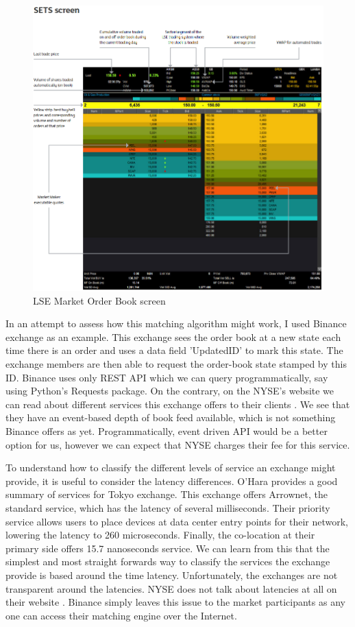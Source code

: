 \documentclass[12pt]{article}
\begin{document}
\begin{figure}[h!]
	\centering
  \includegraphics[scale=0.55]{lse.png}
  \caption{LSE Market Order Book screen}
  \label{fig:lse}
\end{figure}
\FloatBarrier

In an attempt to assess how this matching algorithm might work, I used Binance exchange as an example. This exchange sees the order book at a new state each time there is an order and uses a data field 'UpdatedID' to mark this state. The exchange members are then able to request the order-book state stamped by this ID. Binance uses only REST API which we can query programmatically, say using Python's Requests package. On the contrary, on the NYSE's website we can read about different services this exchange offers to their clients \cite{nyse}. We see that they have an event-based depth of book feed available, which is not something Binance offers as yet. Programmatically, event driven API would be a better option for us, however we can expect that NYSE charges their fee for this service.

To understand how to classify the different levels of service an exchange might provide, it is useful to consider the latency differences. O'Hara \cite{ohara} provides a good summary of services for Tokyo exchange. This exchange offers Arrownet, the standard service, which has the latency of several milliseconds. Their priority service allows users to place devices at data center entry points for their network, lowering the latency to  260 microseconds. Finally, the co-location at their primary side offers 15.7 nanoseconds service. We can learn from this that the simplest and most straight forwards way to classify the services the exchange provide is based around the time latency. Unfortunately, the exchanges are not transparent around the latencies. NYSE does not talk about latencies at all on their website \cite{nyse}. Binance simply leaves this issue to the market participants as any one can access their matching engine over the Internet.
\end{document}
